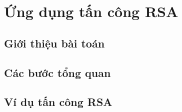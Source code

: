 \documentclass{article}
\begin{document}
\section{Ứng dụng tấn công RSA}

 



\subsection{Giới thiệu bài toán}
 



\subsection{Các bước tổng quan}
 



\subsection{Ví dụ tấn công RSA}
\end{document}
